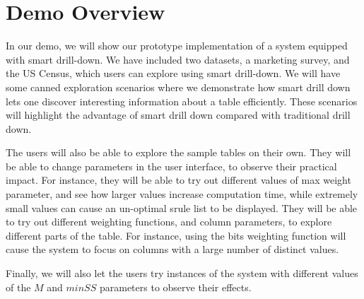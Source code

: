
\section{Demo Overview} \label{sec:demo} 
In our demo, we will show our prototype implementation of a system equipped with smart drill-down. We have included two datasets, a marketing survey, and the US Census, which users can explore using smart drill-down. We will have some canned exploration scenarios where we demonstrate how smart drill down lets one discover interesting information about a table efficiently. These scenarios will highlight the advantage of smart drill down compared with traditional drill down. 

The users will also be able to explore the sample tables on their own. They will be able to change parameters in the user interface, to observe their practical impact. For instance, they will be able to try out different values of max weight parameter, and see how larger values increase computation time, while extremely small values can cause an un-optimal srule list to be displayed. They will be able to try out different weighting functions, and column parameters, to explore different parts of the table. For instance, using the bits weighting function will cause the system to focus on columns with a large number of distinct values. 

Finally, we will also let the users try instances of the system with different values of the $M$ and $minSS$ parameters to observe their effects. 

\balance
